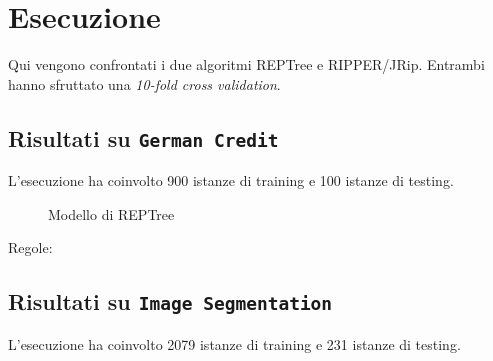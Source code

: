 \chapter{Esecuzione}
\label{ch:results}
Qui vengono confrontati i due algoritmi REPTree e RIPPER/JRip. Entrambi hanno sfruttato una \textit{10-fold cross validation}.

\section{Risultati su \texttt{German Credit}}

\normalsize L'esecuzione ha coinvolto 900 istanze di training e 100 istanze di testing.

\begin{mdframed}[frametitle=Esecuzione REPTree]
	\footnotesize
\end{mdframed}



\begin{figure}
	\caption{Modello di REPTree}
\end{figure}

\pagebreak

\begin{mdframed}[frametitle=Esecuzione JRip]
	\footnotesize
\end{mdframed}



\noindent
\normalsize Regole:
\footnotesize

\pagebreak

\section{Risultati su \texttt{Image Segmentation}}

\normalsize L'esecuzione ha coinvolto 2079 istanze di training e 231 istanze di testing.

